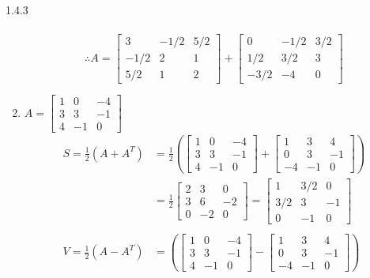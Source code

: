 \documentclass{article}
\theoremstyle{definition}
\begin{document}
\begin{prob}{1.4.3}
\begin{enumerate}[label=(\alph*)]
\begin{align*}
				\end{align*}
				$$ \therefore \boxed{ A = \begin{bmatrix} 3 & -1/2 & 5/2 \\ -1/2 & 2 & 1 \\ 5/2 & 1 & 2 \end{bmatrix} + \begin{bmatrix} 0 & -1/2 & 3/2 \\ 1/2 & 3/2 & 3 \\ -3/2 & -4 & 0 \end{bmatrix} } $$
				
			\item $ A = \begin{bmatrix} 1 & 0 & -4 \\ 3 & 3 & -1 \\ 4 & -1 & 0 \end{bmatrix} $
				\begin{align*}
					S = \frac{1}{2}(A+A^T) &= \frac{1}{2} \left( \begin{bmatrix} 1 & 0 & -4 \\ 3 & 3 & -1 \\ 4 & -1 & 0 \end{bmatrix} + \begin{bmatrix} 1 & 3 & 4 \\ 0 & 3 & -1 \\ -4 & -1 & 0 \end{bmatrix} \right) \\
					&= \frac{1}{2} \begin{bmatrix} 2 & 3 & 0 \\ 3 & 6 & -2 \\ 0 & -2 & 0 \end{bmatrix}
					= \begin{bmatrix} 1 & 3/2 & 0 \\ 3/2 & 3 & -1 \\ 0 & -1 & 0 \end{bmatrix} \\ \\
					V = \frac{1}{2}(A-A^T) &= \left( \begin{bmatrix} 1 & 0 & -4 \\ 3 & 3 & -1 \\ 4 & -1 & 0 \end{bmatrix} - \begin{bmatrix} 1 & 3 & 4 \\ 0 & 3 & -1 \\ -4 & -1 & 0 \end{bmatrix} \right) \\

\end{align*}
\end{enumerate}
\end{prob}
\end{document}
